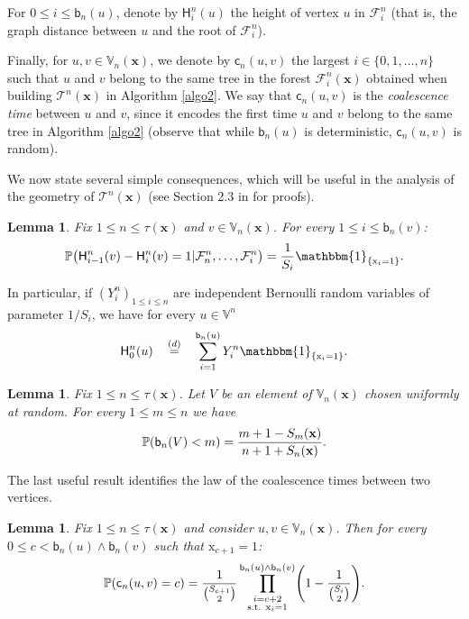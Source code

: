 \documentclass[11pt]{article}
\theoremstyle{plain}
\newtheorem{lemma}[theorem]{Lemma}
\theoremstyle{definition}
\theoremstyle{remark}
\newcommand{\1}{\mathbbm{1}} %
\newcommand{\proba}[1]{\mathbb{P}\left(#1\right)} %
\newcommand{\T}{\mathcal{T}} %
\newcommand{\F}{\mathcal{F}} %
\newcommand{\birth}{\mathsf{b}} %
\newcommand{\coal}{\mathsf{c}} %
\renewcommand{\H}{\mathsf{H}} %
\newcommand{\Xb}{\mathrm{\mathbf{x}}} %
\newcommand{\X}{\mathrm x} %
\newcommand{\V}{\mathbb{V}} %
\let\originalleft\left
\let\originalright\right
\renewcommand{\left}{\mathopen{}\mathclose\bgroup\originalleft}
\renewcommand{\right}{\aftergroup\egroup\originalright}
\begin{document}
For  $0 \leq i \leq \birth_n(u)$, denote by $\H^n_i(u)$ the height of vertex $u$ in $\F^n_i$ (that is, the graph distance between $u$ and the root of $\F^{n}_{i}$).

Finally,  for $u,v \in \V_{n}(\Xb)$, we denote by $\coal_{n}(u,v)$ the largest $i \in \{0,1, \ldots,n\}$ such that $u$ and $v$  belong to the same tree in the forest $\mathcal{F}^{n}_{i}(\Xb)$ obtained when building $\T^{n}(\Xb)$ in Algorithm \ref{algo2}.  We say that $\coal_{n}(u,v)$ is the \emph{coalescence time} between $u$ and $v$, since it encodes the first time $u$ and $v$ belong to the same tree  in Algorithm \ref{algo2} (observe that while $\birth_{n}(u)$ is deterministic, $\coal_{n}(u,v)$ is random).


We now state several simple consequences, which will be useful in the analysis of the geometry of $\T^{n}(\Xb)$ (see Section 2.3 in \cite{BBKK23+} for proofs).
\begin{lemma}
\label{lem:accroissementH}
Fix $1 \leq n \leq \tau(\Xb)$  and  $v \in \V_{n}(\Xb)$. For  every $1 \leq i \leq \birth_{n}(v)$:
\[
\proba{\H^n_{i-1}(v)-\H^n_i(v)=1 | \F^n_n, \ldots, \F^n_i} = \frac{1}{S_{i}}\mathbbm{1}_{\{\X_i=1\}}.
\]
\end{lemma}

 In particular, if $(Y^{n}_i)_{1\leq i \leq n}$ are independent Bernoulli random variables of parameter $1/S_i$, we have for every $u \in \V^{n}$
\begin{equation}
\label{eq:H0} \H^{n}_{0}(u) \quad \mathop{=}^{(d)} \quad \sum_{i=1}^{\birth_{n}(u)} Y^{n}_i\1_{\{\X_i=1\}}.
\end{equation}



\begin{lemma}
\label{lem:bunif}
Fix $1 \leq n \leq \tau(\Xb)$. Let $V$ be an element of $\V_{n}(\Xb)$ chosen uniformly at random. For every $1 \leq m \leq n$ we have
\[
\proba{\birth_n(V) < m}  = \frac{m+1-S_m(\Xb)}{n+1+S_n(\Xb)}.    
\]
\end{lemma}
 The last useful result identifies the law of the coalescence times between two vertices.
\begin{lemma}
\label{loi du temps de coalescence}
Fix $1 \leq n \leq \tau(\Xb)$ and consider $u,v \in \V_{n}(\Xb)$. Then for every $0 \leq c < \birth_{n}(u) \wedge \birth_{n}(v)$ such that $\X_{c+1}=1$:
\[\proba{\coal_{n}(u,v)=c}=\frac{1}{\binom{S_{c+1}}{2}} \prod_{\substack{i=c+2 \\ \text{s.t. } \X_i=1}}^{ \birth_{n}(u) \wedge \birth_{n}(v) } \left(1-\frac{1}{\binom{S_i}{2}}\right).\]
\end{lemma}
\end{document}
